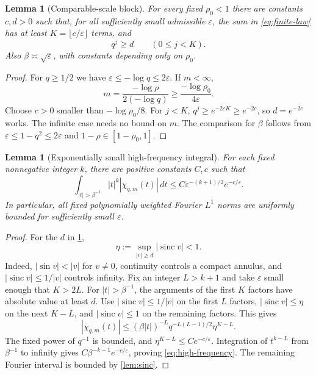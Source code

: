 \documentclass[11pt,a4paper]{article}
\numberwithin{equation}{section}
\newtheorem{lemma}[theorem]{Lemma}
\theoremstyle{definition}
\theoremstyle{remark}
\newcommand{\eps}{\varepsilon}
\newcommand{\sinc}{\operatorname{sinc}}
\begin{document}
\begin{lemma}[Comparable-scale block]
\label{lem:block}
For every fixed $\rho_0<1$ there are constants $c,d>0$ such that, for all
sufficiently small admissible $\eps$, the sum in \eqref{eq:finite-law} has at
least $K=\lfloor c/\eps\rfloor$ terms, and
\begin{equation}
 q^j\ge d\qquad(0\le j<K).
 \label{eq:block}
\end{equation}
Also $\beta\asymp\sqrt\eps$, with constants depending only on $\rho_0$.
\end{lemma}
\begin{proof}
For $q\ge1/2$ we have $\eps\le-\log q\le2\eps$. If $m<\infty$,
\[
 m=\frac{-\log\rho}{2(-\log q)}
 \ge\frac{-\log\rho_0}{4\eps}.
\]
Choose $c>0$ smaller than $-\log\rho_0/8$. For $j<K$,
$q^j\ge e^{-2\eps K}\ge e^{-2c}$, so $d=e^{-2c}$ works.
The infinite case needs no bound on $m$. The comparison for $\beta$ follows
from $\eps\le1-q^2\le2\eps$ and $1-\rho\in[1-\rho_0,1]$.
\end{proof}

\begin{lemma}[Exponentially small high-frequency integral]
\label{lem:high}
For each fixed nonnegative integer $k$, there are positive constants $C,c$
such that
\begin{equation}
 \int_{|t|>\beta^{-1}}|t|^k|\chi_{q,m}(t)|\,dt
 \le C\eps^{-(k+1)/2}e^{-c/\eps}.
 \label{eq:high-frequency}
\end{equation}
In particular, all fixed polynomially weighted Fourier $L^1$ norms are
uniformly bounded for sufficiently small $\eps$.
\end{lemma}
\begin{proof}
For the $d$ in \cref{lem:block},
\[
 \eta:=\sup_{|v|\ge d}|\sinc v|<1.
\]
Indeed, $|\sin v|<|v|$ for $v\ne0$, continuity controls a compact annulus,
and $|\sinc v|\le1/|v|$ controls infinity.
Fix an integer $L>k+1$ and take $\eps$ small enough that $K>2L$.
For $|t|>\beta^{-1}$, the arguments of the first $K$ factors have absolute
value at least $d$. Use $|\sinc v|\le1/|v|$ on the first $L$ factors,
$|\sinc v|\le\eta$ on the next $K-L$, and $|\sinc v|\le1$ on the
remaining factors. This gives
\begin{equation}
 |\chi_{q,m}(t)|
 \le(\beta|t|)^{-L}q^{-L(L-1)/2}\eta^{K-L}.
 \label{eq:pointwise-high}
\end{equation}
The fixed power of $q^{-1}$ is bounded, and
$\eta^{K-L}\le C e^{-c/\eps}$. Integration of $t^{k-L}$ from
$\beta^{-1}$ to infinity gives $C\beta^{-k-1}e^{-c/\eps}$, proving
\eqref{eq:high-frequency}. The remaining Fourier interval is bounded by
\cref{lem:sinc}.
\end{proof}
\end{document}
